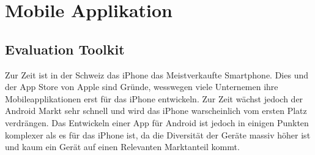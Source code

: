 \section{Mobile Applikation} %
\label{sec:Mobile Applikation}

\subsection{Evaluation Toolkit} %
\label{sub:Evaluation Toolkit}
Zur Zeit ist in der Schweiz das iPhone das Meistverkaufte Smartphone. Dies und der App Store von Apple sind Gründe, wesswegen viele Unternemen ihre Mobileapplikationen erst für das iPhone entwickeln. Zur Zeit wächst jedoch der Android Markt sehr schnell und wird das iPhone warscheinlich vom ersten Platz verdrängen. Das Entwickeln einer App für Android ist jedoch in einigen Punkten komplexer als es für das iPhone ist, da die Diversität der Geräte massiv höher ist und kaum ein Gerät auf einen Relevanten Marktanteil kommt.
